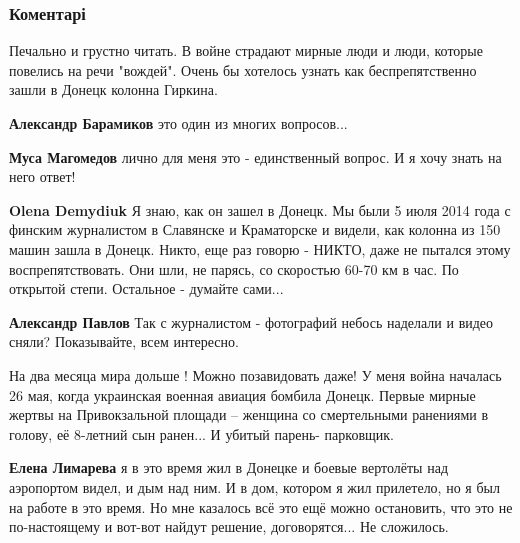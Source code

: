  
 
 
 
 
\subsubsection{Коментарі}

\begin{itemize} %

Печально и грустно читать. В войне страдают мирные люди и люди, которые
повелись на речи "вождей". Очень бы хотелось узнать как беспрепятственно зашли
в Донецк колонна Гиркина.

\begin{itemize} %
\textbf{Александр Барамиков} это один из многих вопросов...

\textbf{Муса Магомедов} лично для меня это - единственный вопрос. И я хочу знать на него ответ!

\textbf{Olena Demydiuk} Я знаю, как он зашел в Донецк. Мы были 5 июля 2014 года с финским журналистом в Славянске и Краматорске и видели, как колонна из 150 машин зашла в Донецк. Никто, еще раз говорю - НИКТО, даже не пытался этому воспрепятствовать. Они шли, не парясь, со скоростью 60-70 км в час. По открытой степи. Остальное - думайте сами...

\textbf{Александр Павлов} Так с журналистом - фотографий небось наделали и видео сняли? Показывайте, всем интересно.
\end{itemize} %


На два месяца мира дольше ! Можно позавидовать даже! У меня война началась 26
мая, когда украинская военная авиация бомбила Донецк. Первые мирные жертвы на
Привокзальной площади – женщина со смертельными ранениями в голову, её 8-летний
сын ранен... И убитый парень- парковщик.

\begin{itemize} %
\textbf{Елена Лимарева} я в это время жил в Донецке и боевые вертолёты над аэропортом видел, и дым над ним. И в дом, котором я жил прилетело, но я был на работе в это время. Но мне казалось всё это ещё можно остановить, что это не по-настоящему и вот-вот найдут решение, договорятся... Не сложилось.


\end{itemize}
\end{itemize}
